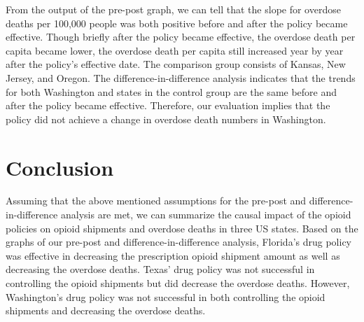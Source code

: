 \documentclass[12pt,letterpaper]{article}
\begin{document}
From the output of the pre-post graph, we can tell that the slope for overdose deaths per 100,000 people was both positive before and after the policy became effective. Though briefly after the policy became effective, the overdose death per capita became lower, the overdose death per capita still increased year by year after the policy's effective date. The comparison group consists of Kansas, New Jersey, and Oregon. The difference-in-difference analysis indicates that the trends for both Washington and states in the control group are the same before and after the policy became effective. Therefore, our evaluation implies that the policy did not achieve a change in overdose death numbers in Washington.


\section{Conclusion}

Assuming that the above mentioned assumptions for the pre-post and difference-in-difference analysis are met, we can summarize the causal impact of the opioid policies on opioid shipments and overdose deaths in three US states. Based on the graphs of our pre-post and difference-in-difference analysis, Florida's drug policy was effective in decreasing the prescription opioid shipment amount as well as decreasing the overdose deaths. Texas' drug policy was not successful in controlling the opioid shipments but did decrease the overdose deaths. However, Washington's drug policy was not successful in both controlling the opioid shipments and decreasing the overdose deaths.
\end{document}
